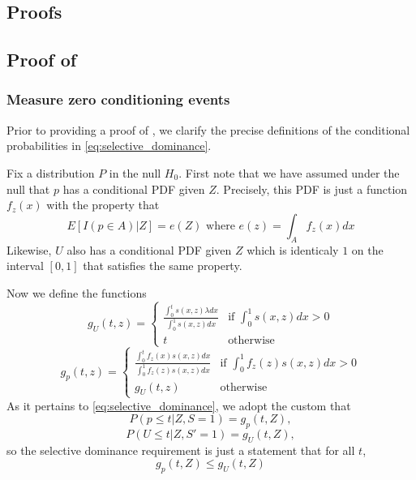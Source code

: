 \documentclass{article}
\begin{document}
\begin{appendix}
\section{Proofs}
\label{sec:proofs_appdx}

\subsection{Proof of }

\iffalse 
\subsubsection{Measure zero conditioning events}
\label{sec:measure_zero_appdx}

Prior to providing a proof of , we clarify the precise definitions of the conditional probabilities in \eqref{eq:selective_dominance}. 

Fix a distribution $P$ in the null $H_0$. First note that we have assumed under the null that $p$ has a conditional PDF given $Z$. Precisely, this PDF is just a function $f_{z}(x)$ with the property that 
\begin{equation*}
    E[I(p \in A) | Z] = e(Z) \text{ where } e(z) = \int_A f_{z}(x) dx
\end{equation*}
Likewise, $U$ also has a conditional PDF given $Z$ which is identicaly $1$ on the interval $[0, 1]$ that satisfies the same property. 


Now we define the functions 
\begin{equation*}
    g_U(t, z) = \begin{cases}
        \frac{\int_0^t s(x, z) \lambda dx}{\int_0^1 s(x, z) dx } & \text{if } \int_0^1 s(x, z) dx > 0\\
        t & \text{otherwise}
    \end{cases}
\end{equation*}
\begin{equation*}
    g_p(t, z) = \begin{cases}
        \frac{\int_0^t f_z(x)s(x, z) dx}{\int_0^1 f_z(z)s(x, z) dx} & \text{if } \int_0^1 f_z(z)s(x, z) dx > 0\\
        g_U(t, z)& \text{otherwise}
    \end{cases}
\end{equation*}
As it pertains to \eqref{eq:selective_dominance}, we adopt the custom that 
\begin{equation*}
    P(p \leq t | Z, S=1) = g_p(t, Z),
\end{equation*}
\begin{equation*}
    P(U \leq t | Z, S'=1) = g_U(t, Z),
\end{equation*}
so the selective dominance requirement is just a statement that for all $t$, 
\begin{equation*}
    g_p(t, Z) \leq g_U(t, Z)
\end{equation*}


\end{appendix}
\end{document}
